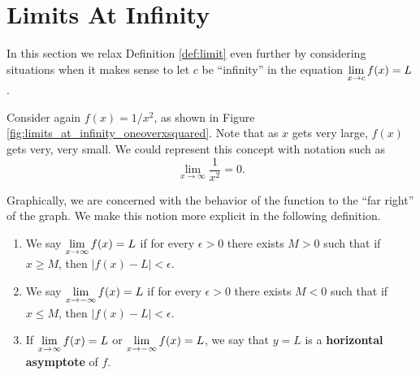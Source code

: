 \section{Limits At Infinity}\label{sec:limits_at_infty}

In this section we relax Definition \ref{def:limit} even further by considering situations when it makes sense to let $c$ be ``infinity'' in the equation $\displaystyle \lim_{x\to c}f(x) = L$.

Consider again $f(x) = 1/x^2$, as shown in Figure \ref{fig:limits_at_infinity_oneoverxsquared}. Note that as $x$ gets very large, $f(x)$ gets very, very small. We could represent this concept with notation such as $$\lim_{x\rightarrow \infty} \frac1{x^2}=0.$$



%

Graphically, we are concerned with the behavior of the function to the ``far right'' of the graph. We make this notion more explicit in the following definition.

{\begin{enumerate}
\item We say $\displaystyle\lim_{x\rightarrow\infty} f(x)=L$ if for every $\epsilon>0$ there exists $M>0$ such that if $x\geq M$, then $|f(x)-L|<\epsilon$. \\

\item We say $\displaystyle\lim_{x\rightarrow-\infty} f(x)=L$ if for every $\epsilon>0$ there exists $M<0$ such that if $x\leq M$, then $|f(x)-L|<\epsilon$. \\

\item  If $\displaystyle\lim_{x\rightarrow\infty} f(x)=L$ or $\displaystyle\lim_{x\rightarrow-\infty} f(x)=L$, we say that $y=L$ is a \textbf{horizontal asymptote} of $f$.
\end{enumerate}
}
\restoreboxwidth

